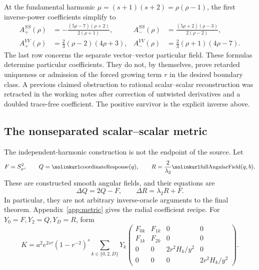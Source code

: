 At the fundamental harmonic \(\mu=(s+1)(s+2)=\rho(\rho-1)\), the first inverse-power coefficients simplify to
\begin{align*}
 A^{SS}_+(\rho)&=-\frac{(5\rho-7)(\rho+2)}{2(\rho+1)},&
 A^{SS}_-(\rho)&=\frac{(5\rho+2)(\rho-3)}{2(\rho-2)},\\
 A^{VV}_+(\rho)&=\tfrac23(\rho-2)(4\rho+3),&
 A^{VV}_-(\rho)&=\tfrac23(\rho+1)(4\rho-7).
\end{align*}
The last row concerns the separate vector--vector particular field.
These formulas determine particular coefficients. They do not, by themselves, prove retarded uniqueness or admission of the forced growing term \(r\) in the desired boundary class. A previous claimed obstruction to rational scalar--scalar reconstruction was retracted in the working notes after correction of untwisted derivatives and a doubled trace-free coefficient. The positive survivor is the explicit inverse above.

\subsection{The nonseparated scalar--scalar metric}

The independent-harmonic construction is not the endpoint of the source. Let
\[
 F=S_\rho^2,\qquad Q=\code{coordinateResponse}(q),\qquad
 R=\frac{2}{\lambda_2}\code{fullAngularField}(q,b).
\]
These are constructed smooth angular fields, and their equations are
\begin{equation}\label{eq:threeangular}
 \Delta Q=2Q-F,\qquad \Delta R=\lambda_2R+F.
\end{equation}
In particular, they are not arbitrary inverse-oracle arguments to the final theorem. Appendix~\ref{app:metric} gives the radial coefficient recipe. For \(Y_0=F,Y_2=Q,Y_D=R\), form
\begin{equation}\label{eq:metric}
 K=a^2e^{2s\tau}(1-r^{-2})^s
 \sum_{k\in\{0,2,D\}}Y_k
 \begin{pmatrix}
 F_{0k}&F_{1k}&0&0\\
 F_{1k}&F_{2k}&0&0\\
 0&0&2r^2H_k/y^2&0\\
 0&0&0&2r^2H_k/y^2
 \end{pmatrix}.
\end{equation}

